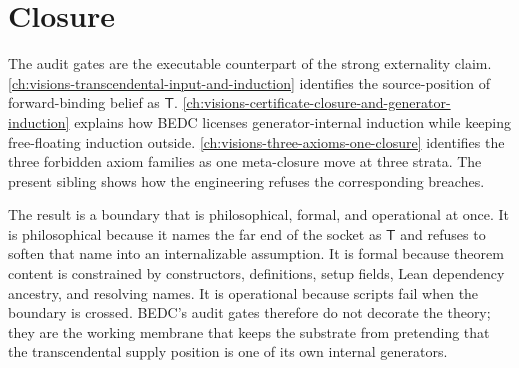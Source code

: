 \section{Closure}
\label{sec:audit-gates-closure}

The audit gates are the executable counterpart of the strong externality claim. \autoref{ch:visions-transcendental-input-and-induction} identifies the source-position of forward-binding belief as $\mathsf{T}$. \autoref{ch:visions-certificate-closure-and-generator-induction} explains how BEDC licenses generator-internal induction while keeping free-floating induction outside. \autoref{ch:visions-three-axioms-one-closure} identifies the three forbidden axiom families as one meta-closure move at three strata. The present sibling shows how the engineering refuses the corresponding breaches.

The result is a boundary that is philosophical, formal, and operational at once. It is philosophical because it names the far end of the socket as $\mathsf{T}$ and refuses to soften that name into an internalizable assumption. It is formal because theorem content is constrained by constructors, definitions, setup fields, Lean dependency ancestry, and resolving names. It is operational because scripts fail when the boundary is crossed. BEDC's audit gates therefore do not decorate the theory; they are the working membrane that keeps the substrate from pretending that the transcendental supply position is one of its own internal generators.
